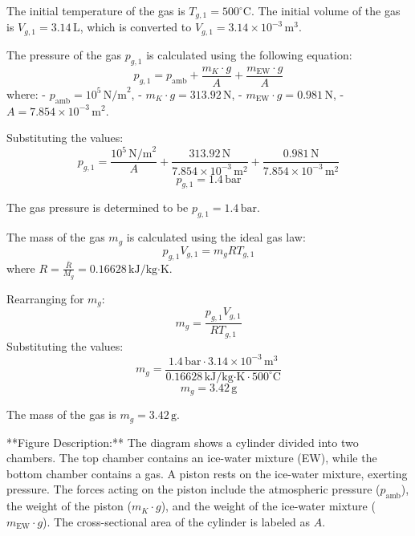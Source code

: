 The initial temperature of the gas is \( T_{g,1} = 500^\circ\text{C} \).  
The initial volume of the gas is \( V_{g,1} = 3.14 \, \text{L} \), which is converted to \( V_{g,1} = 3.14 \times 10^{-3} \, \text{m}^3 \).  

The pressure of the gas \( p_{g,1} \) is calculated using the following equation:  
\[
p_{g,1} = p_{\text{amb}} + \frac{m_K \cdot g}{A} + \frac{m_{\text{EW}} \cdot g}{A}
\]  
where:  
- \( p_{\text{amb}} = 10^5 \, \text{N/m}^2 \),  
- \( m_K \cdot g = 313.92 \, \text{N} \),  
- \( m_{\text{EW}} \cdot g = 0.981 \, \text{N} \),  
- \( A = 7.854 \times 10^{-3} \, \text{m}^2 \).  

Substituting the values:  
\[
p_{g,1} = \frac{10^5 \, \text{N/m}^2}{A} + \frac{313.92 \, \text{N}}{7.854 \times 10^{-3} \, \text{m}^2} + \frac{0.981 \, \text{N}}{7.854 \times 10^{-3} \, \text{m}^2}
\]  
\[
p_{g,1} = 1.4 \, \text{bar}
\]  

The gas pressure is determined to be \( p_{g,1} = 1.4 \, \text{bar} \).  

The mass of the gas \( m_g \) is calculated using the ideal gas law:  
\[
p_{g,1} V_{g,1} = m_g R T_{g,1}
\]  
where \( R = \frac{\bar{R}}{M_g} = 0.16628 \, \text{kJ/kg·K} \).  

Rearranging for \( m_g \):  
\[
m_g = \frac{p_{g,1} V_{g,1}}{R T_{g,1}}
\]  
Substituting the values:  
\[
m_g = \frac{1.4 \, \text{bar} \cdot 3.14 \times 10^{-3} \, \text{m}^3}{0.16628 \, \text{kJ/kg·K} \cdot 500^\circ\text{C}}
\]  
\[
m_g = 3.42 \, \text{g}
\]  

The mass of the gas is \( m_g = 3.42 \, \text{g} \).  

**Figure Description:**  
The diagram shows a cylinder divided into two chambers. The top chamber contains an ice-water mixture (EW), while the bottom chamber contains a gas. A piston rests on the ice-water mixture, exerting pressure. The forces acting on the piston include the atmospheric pressure (\( p_{\text{amb}} \)), the weight of the piston (\( m_K \cdot g \)), and the weight of the ice-water mixture (\( m_{\text{EW}} \cdot g \)). The cross-sectional area of the cylinder is labeled as \( A \).